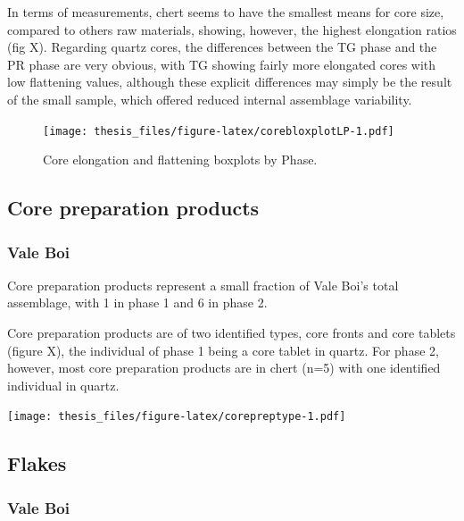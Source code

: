 \documentclass[12pt,twoside]{reedthesis}
\begin{document}
In terms of measurements, chert seems to have the smallest means for core size, compared to others raw materials, showing, however, the highest elongation ratios (fig X). Regarding quartz cores, the differences between the TG phase and the PR phase are very obvious, with TG showing fairly more elongated cores with low flattening values, although these explicit differences may simply be the result of the small sample, which offered reduced internal assemblage variability.
\begin{figure}
\centering
\texttt{[image: thesis\_files/figure-latex/corebloxplotLP-1.pdf]}
\caption{\label{fig:corebloxplotLP}Core elongation and flattening boxplots by Phase.}
\end{figure}
\hypertarget{core-preparation-products}{%
\subsection{Core preparation products}\label{core-preparation-products}}

\hypertarget{vale-boi-3}{%
\subsubsection{Vale Boi}\label{vale-boi-3}}

Core preparation products represent a small fraction of Vale Boi's total assemblage, with 1 in phase 1 and 6 in phase 2.

Core preparation products are of two identified types, core fronts and core tablets (figure X), the individual of phase 1 being a core tablet in quartz. For phase 2, however, most core preparation products are in chert (n=5) with one identified individual in quartz.

\texttt{[image: thesis\_files/figure-latex/corepreptype-1.pdf]}

\hypertarget{flakes}{%
\subsection{Flakes}\label{flakes}}

\hypertarget{vale-boi-4}{%
\subsubsection{Vale Boi}\label{vale-boi-4}}
\end{document}
